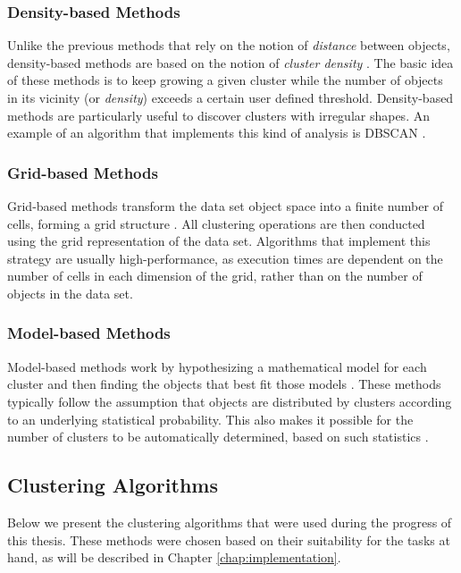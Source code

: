 \subsubsection*{Density-based Methods}

Unlike the previous methods that rely on the notion of \emph{distance} between
objects, density-based methods are based on the notion of \emph{cluster density}
\cite{han2006data}. The basic idea of these methods is to keep growing a given
cluster while the number of objects in its vicinity (or \emph{density}) exceeds
a certain user defined threshold. Density-based methods are particularly useful
to discover clusters with irregular shapes. An example of an algorithm that
implements this kind of analysis is DBSCAN \cite{Ester96adensity-based}.

\subsubsection*{Grid-based Methods}

Grid-based methods transform the data set object space into a finite number of
cells, forming a grid structure
\cite{han2006data,DBLP:journals/corr/abs-1205-1117}. All clustering operations
are then conducted using the grid representation of the data set. Algorithms
that implement this strategy are usually high-performance, as execution times
are dependent on the number of cells in each dimension of the grid, rather than
on the number of objects in the data set.

\subsubsection*{Model-based Methods}

Model-based methods work by hypothesizing a mathematical model for each cluster
and then finding the objects that best fit those models
\cite{DBLP:journals/corr/abs-1205-1117}. These methods typically follow the
assumption that objects are distributed by clusters according to an underlying
statistical probability. This also makes it possible for the number of clusters
to be automatically determined, based on such statistics \cite{han2006data}.

\subsection{Clustering Algorithms}\label{sec:clusteralgo}

Below we present the clustering algorithms that were used during the progress of
this thesis. These methods were chosen based on their suitability for the tasks
at hand, as will be described in Chapter \ref{chap:implementation}.

